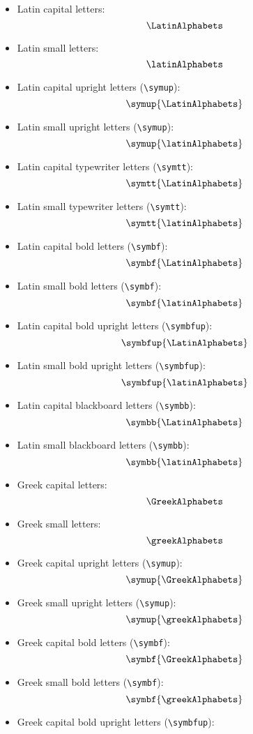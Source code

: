 \documentclass { article }
\begin{document}
\begin{itemize}
  \item Latin capital letters:
        \[ \LatinAlphabets \]
  \item Latin small letters:
        \[ \latinAlphabets \]
  \item Latin capital upright letters (\verb|\symup|):
        \[ \symup{\LatinAlphabets} \]
  \item Latin small upright letters (\verb|\symup|):
        \[ \symup{\latinAlphabets} \]
  \item Latin capital typewriter letters (\verb|\symtt|):
        \[ \symtt{\LatinAlphabets} \]
  \item Latin small typewriter letters (\verb|\symtt|):
        \[ \symtt{\latinAlphabets} \]
  \item Latin capital bold letters (\verb|\symbf|):
        \[ \symbf{\LatinAlphabets} \]
  \item Latin small bold letters (\verb|\symbf|):
        \[ \symbf{\latinAlphabets} \]
  \item Latin capital bold upright letters (\verb|\symbfup|):
        \[ \symbfup{\LatinAlphabets} \]
  \item Latin small bold upright letters (\verb|\symbfup|):
        \[ \symbfup{\latinAlphabets} \]
  \item Latin capital blackboard letters (\verb|\symbb|):
        \[ \symbb{\LatinAlphabets} \]
  \item Latin small blackboard letters (\verb|\symbb|):
        \[ \symbb{\latinAlphabets} \]
  \item Greek capital letters:
        \[ \GreekAlphabets \]
  \item Greek small letters:
        \[ \greekAlphabets \]
  \item Greek capital upright letters (\verb|\symup|):
        \[ \symup{\GreekAlphabets} \]
  \item Greek small upright letters (\verb|\symup|):
        \[ \symup{\greekAlphabets} \]
  \item Greek capital bold letters (\verb|\symbf|):
        \[ \symbf{\GreekAlphabets} \]
  \item Greek small bold letters (\verb|\symbf|):
        \[ \symbf{\greekAlphabets} \]
  \item Greek capital bold upright letters (\verb|\symbfup|):

\end{itemize}
\end{document}
